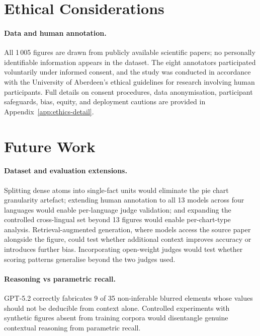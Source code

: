 \section{Ethical Considerations}\label{sec:ethics}

\paragraph{Data and human annotation.}
All 1\,005 figures are drawn from publicly available scientific papers; no personally identifiable information appears in the dataset.
The eight annotators participated voluntarily under informed consent, and the study was conducted in accordance with the University of Aberdeen's ethical guidelines for research involving human participants.
Full details on consent procedures, data anonymisation, participant safeguards, bias, equity, and deployment cautions are provided in Appendix~\ref{app:ethics-detail}.

\section{Future Work}\label{sec:future-work}

\paragraph{Dataset and evaluation extensions.}
Splitting dense atoms into single-fact units would eliminate the pie chart granularity artefact; extending human annotation to all 13 models across four languages would enable per-language judge validation; and expanding the controlled cross-lingual set beyond 13 figures would enable per-chart-type analysis.
Retrieval-augmented generation, where models access the source paper alongside the figure, could test whether additional context improves accuracy or introduces further bias.
Incorporating open-weight judges would test whether scoring patterns generalise beyond the two judges used.

\paragraph{Reasoning vs parametric recall.}
GPT-5.2 correctly fabricates 9 of 35 non-inferable blurred elements whose values should not be deducible from context alone.
Controlled experiments with synthetic figures absent from training corpora would disentangle genuine contextual reasoning from parametric recall.

